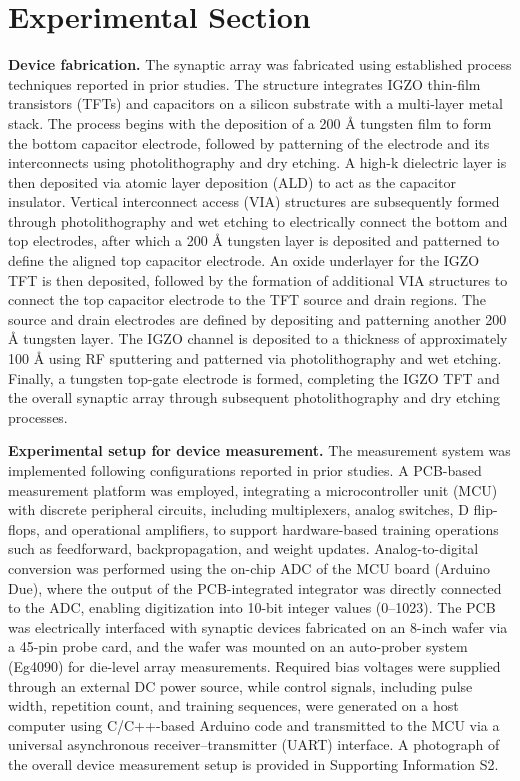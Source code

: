 \documentclass[AMA,LATO2COL]{WileyNJDv5}
\begin{document}
\section{Experimental Section}
\label{sec:experimental}

\noindent\textbf{Device fabrication.}
The synaptic array was fabricated using established process techniques reported in prior studies\cite{won2023advs_6t1c, kang2025advs_disturbance}. The structure integrates IGZO thin-film transistors (TFTs) and capacitors on a silicon substrate with a multi-layer metal stack. The process begins with the deposition of a 200 Å tungsten film to form the bottom capacitor electrode, followed by patterning of the electrode and its interconnects using photolithography and dry etching. A high-k dielectric layer is then deposited via atomic layer deposition (ALD) to act as the capacitor insulator. Vertical interconnect access (VIA) structures are subsequently formed through photolithography and wet etching to electrically connect the bottom and top electrodes, after which a 200 Å tungsten layer is deposited and patterned to define the aligned top capacitor electrode. An oxide underlayer for the IGZO TFT is then deposited, followed by the formation of additional VIA structures to connect the top capacitor electrode to the TFT source and drain regions. The source and drain electrodes are defined by depositing and patterning another 200 Å tungsten layer. The IGZO channel is deposited to a thickness of approximately 100 Å using RF sputtering and patterned via photolithography and wet etching. Finally, a tungsten top-gate electrode is formed, completing the IGZO TFT and the overall synaptic array through subsequent photolithography and dry etching processes.

\noindent\textbf{Experimental setup for device measurement.}
The measurement system was implemented following configurations reported in prior studies\cite{won2023advs_6t1c, kang2025advs_disturbance}. A PCB-based measurement platform was employed, integrating a microcontroller unit (MCU) with discrete peripheral circuits, including multiplexers, analog switches, D flip-flops, and operational amplifiers, to support hardware-based training operations such as feedforward, backpropagation, and weight updates. Analog-to-digital conversion was performed using the on-chip ADC of the MCU board (Arduino Due), where the output of the PCB-integrated integrator was directly connected to the ADC, enabling digitization into 10-bit integer values (0–1023). The PCB was electrically interfaced with synaptic devices fabricated on an 8-inch wafer via a 45-pin probe card, and the wafer was mounted on an auto-prober system (Eg4090) for die-level array measurements. Required bias voltages were supplied through an external DC power source, while control signals, including pulse width, repetition count, and training sequences, were generated on a host computer using C/C++-based Arduino code and transmitted to the MCU via a universal asynchronous receiver–transmitter (UART) interface. A photograph of the overall device measurement setup is provided in Supporting Information S2.
\end{document}
